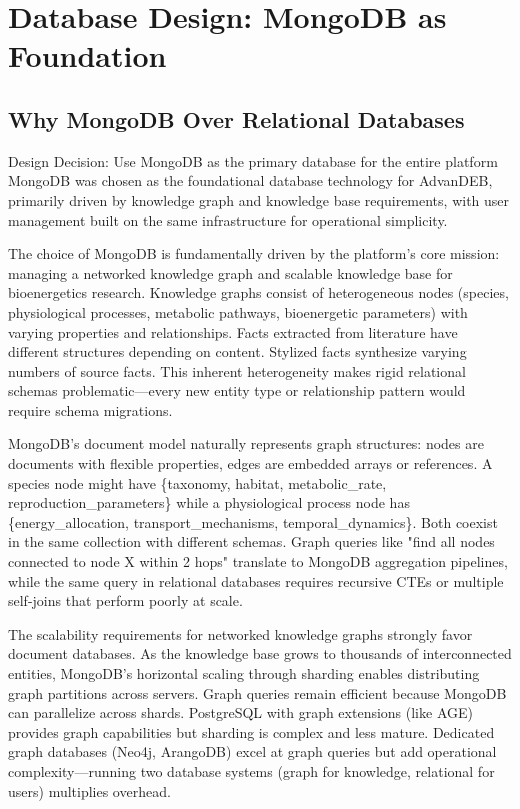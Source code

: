 \documentclass[12pt,a4paper]{article}
\begin{document}
\section{Database Design: MongoDB as Foundation}

\subsection{Why MongoDB Over Relational Databases}

\begin{rationale}{Design Decision: Use MongoDB as the primary database for the entire platform}
MongoDB was chosen as the foundational database technology for AdvanDEB, primarily driven by knowledge graph and knowledge base requirements, with user management built on the same infrastructure for operational simplicity.
\end{rationale}

The choice of MongoDB is fundamentally driven by the platform's core mission: managing a networked knowledge graph and scalable knowledge base for bioenergetics research. Knowledge graphs consist of heterogeneous nodes (species, physiological processes, metabolic pathways, bioenergetic parameters) with varying properties and relationships. Facts extracted from literature have different structures depending on content. Stylized facts synthesize varying numbers of source facts. This inherent heterogeneity makes rigid relational schemas problematic—every new entity type or relationship pattern would require schema migrations.

MongoDB's document model naturally represents graph structures: nodes are documents with flexible properties, edges are embedded arrays or references. A species node might have \{taxonomy, habitat, metabolic\_rate, reproduction\_parameters\} while a physiological process node has \{energy\_allocation, transport\_mechanisms, temporal\_dynamics\}. Both coexist in the same collection with different schemas. Graph queries like "find all nodes connected to node X within 2 hops" translate to MongoDB aggregation pipelines, while the same query in relational databases requires recursive CTEs or multiple self-joins that perform poorly at scale.

The scalability requirements for networked knowledge graphs strongly favor document databases. As the knowledge base grows to thousands of interconnected entities, MongoDB's horizontal scaling through sharding enables distributing graph partitions across servers. Graph queries remain efficient because MongoDB can parallelize across shards. PostgreSQL with graph extensions (like AGE) provides graph capabilities but sharding is complex and less mature. Dedicated graph databases (Neo4j, ArangoDB) excel at graph queries but add operational complexity—running two database systems (graph for knowledge, relational for users) multiplies overhead.
\end{document}
